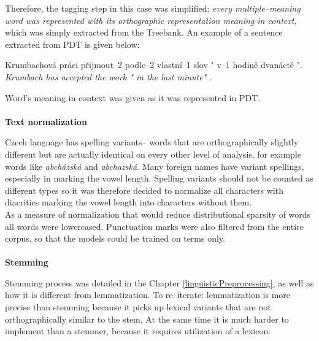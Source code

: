 Therefore, the tagging step in this case was simplified: \textit{every multiple--meaning word was 
represented with its orthographic representation meaning in context}, which was simply extracted from 
the Treebank. An example of a sentence extracted from PDT is given below:
\begin{examples}
\item Krumbachov\'a pr\'aci p\v{r}ijmout--2 podle--2 vlastn\'i--1 slov " v--1 hodin\^e dvan\'act\'e ".
\glt \textit{ Krumbach has accepted the work " in the last minute" .} 
\end{examples}
Word's meaning in context was given as it was represented in PDT.
\\\\  \textbf{Text normalization}

Czech language has spelling variants-- words that are orthographically slightly different but are actually 
identical on every other level of analysis, for example words like \textit{abch\'azsk\'a}  and 
\textit{abchazsk\'a}. Many foreign names have variant spellings, especially in marking the vowel length. 
Spelling variants should not be counted as different types so it was therefore decided to normalize all 
characters with diacritics marking the vowel length into characters without them. 
\\As a measure of normalization that would reduce distributional sparsity of words all words were 
lowercased. Punctuation marks were also filtered from the entire corpus, so that the models could be 
trained on terms only. 
\\\\  \textbf{Stemming}

Stemming process was detailed in the Chapter \ref{linguisticPreprocessing}, as well as how it is different 
from lemmatization. To re--iterate: lemmatization is more precise than stemming because it picks up 
lexical variants that are not orthographically similar to the stem. At the same time it is much harder to 
implement than a stemmer, because it requires utilization of a lexicon. 

